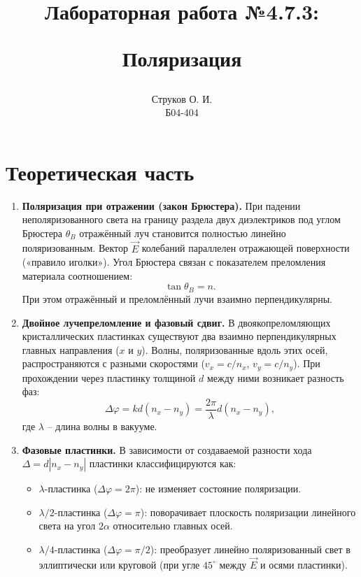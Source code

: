 \documentclass[12pt]{article}
\begin{document}
\title{\begin{center}Лабораторная работа №4.7.3:\end{center}
Поляризация}
\author{Струков О. И. \\ Б04-404}
\date{}

\thispagestyle{empty}
\maketitle
\newpage
{}

\section*{Теоретическая часть}
\begin{enumerate}
    \item \textbf{Поляризация при отражении (закон Брюстера).} При падении неполяризованного света на границу раздела двух диэлектриков под углом Брюстера $\theta_B$ отражённый луч становится полностью линейно поляризованным. Вектор $\vec{E}$ колебаний параллелен отражающей поверхности («правило иголки»). Угол Брюстера связан с показателем преломления материала соотношением:
    \begin{equation}
        \tan \theta_B = n.
    \end{equation}
    При этом отражённый и преломлённый лучи взаимно перпендикулярны.

    \item \textbf{Двойное лучепреломление и фазовый сдвиг.} В двоякопреломляющих кристаллических пластинках существуют два взаимно перпендикулярных главных направления ($x$ и $y$). Волны, поляризованные вдоль этих осей, распространяются с разными скоростями ($v_x = c/n_x$, $v_y = c/n_y$). При прохождении через пластинку толщиной $d$ между ними возникает разность фаз:
    \begin{equation}
        \Delta \varphi = k d (n_x - n_y) = \frac{2\pi}{\lambda} d (n_x - n_y),
    \end{equation}
    где $\lambda$ -- длина волны в вакууме.

    \item \textbf{Фазовые пластинки.} В зависимости от создаваемой разности хода $\Delta = d|n_x - n_y|$ пластинки классифицируются как:
    \begin{itemize}
        \item $\lambda$-пластинка ($\Delta \varphi = 2\pi$): не изменяет состояние поляризации.
        \item $\lambda/2$-пластинка ($\Delta \varphi = \pi$): поворачивает плоскость поляризации линейного света на угол $2\alpha$ относительно главных осей.
        \item $\lambda/4$-пластинка ($\Delta \varphi = \pi/2$): преобразует линейно поляризованный свет в эллиптически или круговой (при угле $45^\circ$ между $\vec{E}$ и осями пластинки).
    \end{itemize}


\end{enumerate}
\end{document}
